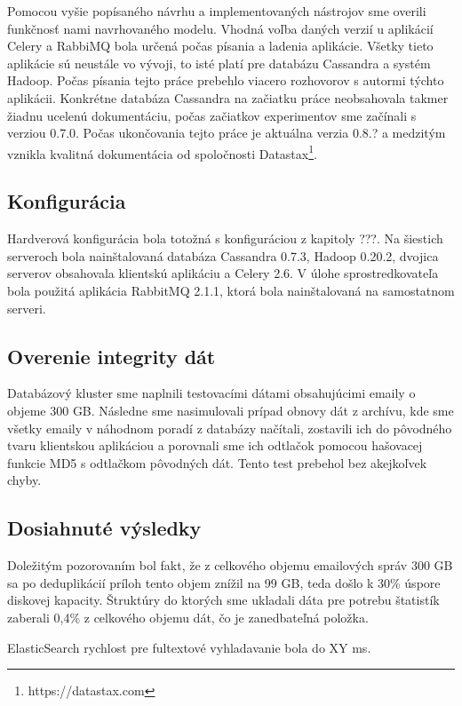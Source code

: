 \documentclass[11pt,twoside,a4paper]{book}
\begin{document}
Pomocou vyšie popísaného návrhu a implementovaných nástrojov sme overili funkčnosť nami navrhovaného modelu. Vhodná voľba daných verzií u aplikácií Celery a RabbiMQ bola určená počas písania a ladenia aplikácie. Všetky tieto aplikácie sú neustále vo vývoji, to isté platí pre databázu Cassandra a systém Hadoop. Počas písania tejto práce prebehlo viacero rozhovorov s autormi týchto aplikácii. Konkrétne databáza Cassandra na začiatku práce neobsahovala takmer žiadnu ucelenú dokumentáciu, počas začiatkov experimentov sme začínali s verziou 0.7.0. Počas ukončovania tejto práce je aktuálna verzia 0.8.? a medzitým vznikla kvalitná dokumentácia od spoločnosti Datastax\footnote{https://datastax.com}. 

\subsection*{Konfigurácia}
Hardverová konfigurácia bola totožná s konfiguráciou z kapitoly ???. Na šiestich serveroch bola nainštalovaná databáza Cassandra 0.7.3, Hadoop 0.20.2, dvojica serverov obsahovala klientskú aplikáciu a Celery 2.6. V úlohe sprostredkovateľa bola použitá aplikácia RabbitMQ 2.1.1, ktorá bola nainštalovaná na samostatnom serveri.

\subsection*{Overenie integrity dát}
Databázový kluster sme naplnili testovacími dátami obsahujúcimi emaily o objeme 300 GB. Následne sme nasimulovali prípad obnovy dát z archívu, kde sme všetky emaily v náhodnom poradí z databázy načítali, zostavili ich do pôvodného tvaru klientskou aplikáciou a porovnali sme ich odtlačok pomocou hašovacej funkcie MD5 s odtlačkom pôvodných dát. Tento test prebehol bez akejkoľvek chyby. 

\subsection*{Dosiahnuté výsledky}
Doležitým pozorovaním bol fakt, že z celkového objemu emailových správ 300 GB sa po deduplikácií príloh tento objem znížil na 99 GB, teda došlo k 30\% úspore diskovej kapacity. Štruktúry do ktorých sme ukladali dáta pre potrebu štatistík zaberali 0,4\% z celkového objemu dát, čo je zanedbateľná položka.

ElasticSearch rychlost pre fultextové vyhladavanie bola do XY ms.
\end{document}
